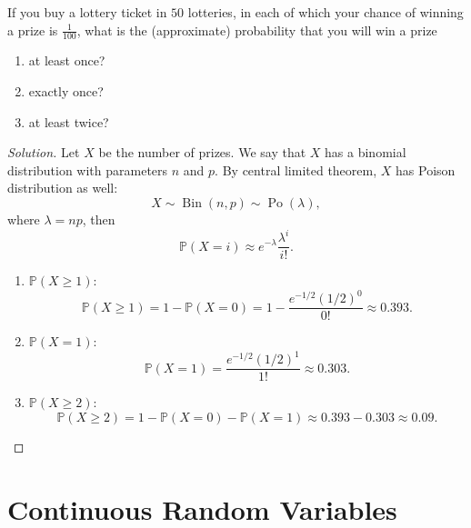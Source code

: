 \documentclass{article}[12pt]
\newenvironment{solution}
  {\renewcommand\qedsymbol{$\blacksquare$}\begin{proof}[Solution]}
  {\end{proof}}
\newenvironment{problem}[1]
  {\renewcommand\theinnercustomprblm{#1}\innercustomprblm}
  {\endinnercustomprblm}
\DeclareMathOperator{\Po}{Po}
\DeclareMathOperator{\Bin}{Bin}
\renewcommand{\P}{\mathbb{P}}
\begin{document}
\begin{problem}{4.59}\normalfont
If you buy a lottery ticket in $50$ lotteries, in each of which your chance of winning a prize is $\tfrac{1}{100}$, what is the (approximate) probability that you will win a prize
\begin{enumerate}[label=(\alph*)]
    \item at least once?
    \item exactly once?
    \item at least twice?
\end{enumerate}
\end{problem}
\begin{solution}
Let $X$ be the number of prizes.
We say that $X$ has a binomial distribution with parameters $n$ and $p$.
By central limited theorem, $X$ has Poison distribution as well:
\begin{equation*}
    X\sim\Bin(n, p)\sim\Po(\lambda),
\end{equation*}
where $\lambda = np$, then
\begin{equation*}
    \P(X = i)\approx e^{-\lambda}\dfrac{\lambda^{i}}{i!}.
\end{equation*}
\begin{enumerate}[label=(\alph*)]
    \item $\P(X \geqslant 1)$:
    \begin{equation*}
        \P(X \geqslant 1) = 1 - \P(X = 0) = 1 - \dfrac{e^{-1/2}(1/2)^{0}}{0!} \approx 0.393.
    \end{equation*}
    
    \item $\P(X = 1)$:
    \begin{equation*}
        \P(X = 1) = \dfrac{e^{-1/2}(1/2)^{1}}{1!} \approx 0.303.
    \end{equation*}
    
    \item $\P(X \geqslant 2)$:
    \begin{equation*}
        \P(X \geqslant 2) = 1 - \P(X = 0) - \P(X = 1) \approx 0.393 - 0.303 \approx 0.09.
    \end{equation*}
\end{enumerate}
\end{solution}

\newpage
\section{Continuous Random Variables}
\end{document}
